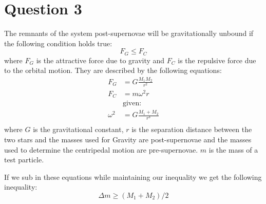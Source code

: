 \documentclass[10pt,a4paper]{article}
\begin{document}
\section*{Question 3}
The remnants of the system post-supernovae will be gravitationally unbound if the following condition holds true:
\begin{equation*}
    F_{G} \leq F_{C}
\end{equation*}
where $F_{G}$ is the attractive force due to gravity and $F_{C}$ is the repulsive force due to the orbital motion. They are described by the following equations:
\begin{align*}
    F_{G} &= G\frac{M_{1}M_{2}}{r^{2}} \\
    F_{C} &= m\omega^{2}r \\
    &\mbox{given:} \\
    \omega^{2} &= G\frac{M_{1}+M_{2}}{r^{3}} \\
\end{align*}
where $G$ is the gravitational constant, $r$ is the separation distance between the two stars and the masses used for Gravity are post-supernovae and the masses used to determine the centripedal motion are pre-supernovae. $m$ is the mass of a test particle.

If we sub in these equations while maintaining our inequality we get the following inequality:
\begin{equation*}
    \Delta m \geq (M_{1}+M_{2})/2
\end{equation*}
\end{document}
